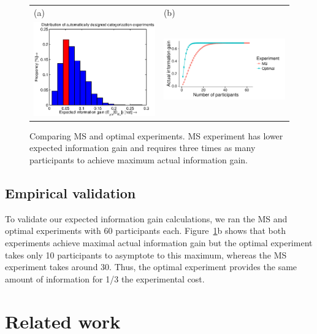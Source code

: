 \documentclass{article}
\begin{document}
\begin{figure}[t]
\centering
\begin{tabular}{l l}
(a) & (b)\\
\includegraphics[width=2.5in]{img/dist.eps} & \includegraphics[width=2.5in]{img/category-ns.pdf}\\
\end{tabular}
\caption{Comparing MS and optimal experiments. MS experiment has lower expected information gain and requires three times as many participants to achieve maximum actual information gain.}
\label{fig:dist}
\end{figure}

\subsection{Empirical validation}

To validate our expected information gain calculations, we ran the MS and optimal experiments with 60 participants each.
Figure~\ref{fig:dist}b shows that both experiments achieve maximal actual information gain but the optimal experiment takes only 10 participants to asymptote to this maximum, whereas the MS experiment takes around 30.
Thus, the optimal experiment provides the same amount of information for 1/3 the experimental cost.


\section{Related work}
\end{document}
